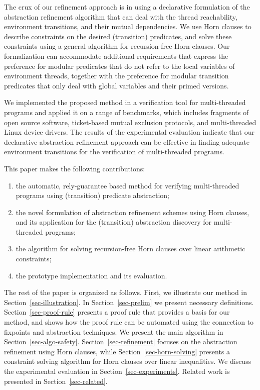 The crux of our refinement approach is in using a declarative
formulation of the abstraction refinement algorithm that can deal with
the thread reachability, environment transitions, and their mutual
dependencies.
We use Horn clauses to describe constraints on the desired
(transition) predicates, and solve these constraints using a general
algorithm for recursion-free Horn clauses.
Our formalization can accommodate additional requirements that express
the preference for modular predicates that do not refer to the local
variables of environment threads, together with the preference for
modular transition predicates that only deal with global variables and
their primed versions.

We implemented the proposed method in a verification tool for
multi-threaded programs and applied it on a range of benchmarks,
which includes fragments of open source software, ticket-based mutual
exclusion protocols, and multi-threaded Linux device drivers.
The results of the experimental evaluation indicate that our
declarative abstraction refinement approach can be effective in
finding adequate environment transitions for the verification of
multi-threaded programs.

This paper makes the following contributions:
\begin{enumerate}
\item the automatic, rely-guarantee based method for verifying
multi-threaded programs using (transition) predicate abstraction;
\item the novel formulation of abstraction refinement schemes using
Horn clauses, and its application for the (transition) abstraction
discovery for multi-threaded programs;
\item the algorithm for solving recursion-free Horn clauses over
linear arithmetic constraints;
\item the prototype implementation and its evaluation.
\end{enumerate}


The rest of the paper is organized as follows. 
First, we illustrate our method in Section~\ref{sec-illustration}.
In Section~\ref{sec-prelim} we present necessary definitions.
Section~\ref{sec-proof-rule} presents a proof rule that provides a
basis for our method, and shows how the proof rule can be automated
using the connection to fixpoints and abstraction techniques.
We present the main algorithm in Section~\ref{sec-algo-safety}.
Section~\ref{sec-refinement} focuses on the abstraction refinement using
Horn clauses, while Section~\ref{sec-horn-solving} presents a
constraint solving algorithm for Horn clauses over linear
inequalities.
We discuss the experimental evaluation in
Section~\ref{sec-experiments}.
Related work is presented in Section~\ref{sec-related}.



